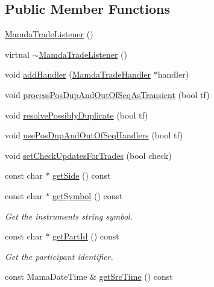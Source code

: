 \subsection*{Public Member Functions}
\begin{CompactItemize}
\item 
\hyperlink{classWombat_1_1MamdaTradeListener_eda66f3805431df1c6b22bf73ad3d482}{Mamda\-Trade\-Listener} ()
\item 
virtual \hyperlink{classWombat_1_1MamdaTradeListener_b6bd421589362265963eab4056bc459e}{$\sim$Mamda\-Trade\-Listener} ()
\item 
void \hyperlink{classWombat_1_1MamdaTradeListener_cfd3096d997d80ead46a5236f92dcb44}{add\-Handler} (\hyperlink{classWombat_1_1MamdaTradeHandler}{Mamda\-Trade\-Handler} $\ast$handler)
\item 
void \hyperlink{classWombat_1_1MamdaTradeListener_bdabe7ac7a04f055f718268aab692d1f}{process\-Pos\-Dup\-And\-Out\-Of\-Seq\-As\-Transient} (bool tf)
\item 
void \hyperlink{classWombat_1_1MamdaTradeListener_253a81861dc4126c732a740357e790ba}{resolve\-Possibly\-Duplicate} (bool tf)
\item 
void \hyperlink{classWombat_1_1MamdaTradeListener_fca43ba073064a9cbf4b90de9a5d6a30}{use\-Pos\-Dup\-And\-Out\-Of\-Seq\-Handlers} (bool tf)
\item 
void \hyperlink{classWombat_1_1MamdaTradeListener_fb487bdb0260021c6deb737b7fe49410}{set\-Check\-Updates\-For\-Trades} (bool check)
\item 
const char $\ast$ \hyperlink{classWombat_1_1MamdaTradeListener_e3cca817a27a4e6b9e5b699f548cd22a}{get\-Side} () const 
\item 
const char $\ast$ \hyperlink{classWombat_1_1MamdaTradeListener_6a4f381f676df4731509adcce8287331}{get\-Symbol} () const 
\begin{CompactList}\small\item\em Get the instruments string symbol. \item\end{CompactList}\item 
const char $\ast$ \hyperlink{classWombat_1_1MamdaTradeListener_9fc3574e811a832c3b7244ebf3dd849d}{get\-Part\-Id} () const 
\begin{CompactList}\small\item\em Get the participant identifier. \item\end{CompactList}\item 
const Mama\-Date\-Time \& \hyperlink{classWombat_1_1MamdaTradeListener_913b0f0e63ffde58f3f01a11d551bc9c}{get\-Src\-Time} () const 

\end{CompactItemize}
